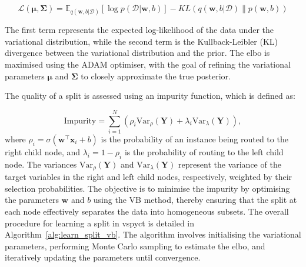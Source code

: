 \documentclass[3p,review,authoryear]{elsarticle}
\begin{document}
\begin{equation}
\mathcal{L}(\boldsymbol{\mu}, \boldsymbol{\Sigma}) = \mathbb{E}_{q(\mathbf{w}, b|\mathcal{D})}\left[\log p(\mathcal{D}|\mathbf{w}, b)\right] - KL\left(q(\mathbf{w}, b|\mathcal{D}) \parallel p(\mathbf{w}, b)\right)
\label{eq:elbo}
\end{equation}

The first term represents the expected log-likelihood of the data under the variational distribution, while the second term is the Kullback-Leibler (KL) divergence between the variational distribution and the prior. The \gls{elbo} is maximised using the ADAM optimiser, with the goal of refining the variational parameters \(\boldsymbol{\mu}\) and \(\boldsymbol{\Sigma}\) to closely approximate the true posterior.

The quality of a split is assessed using an impurity function, which is defined as:

\begin{equation}
\text{Impurity} = \sum_{i=1}^{N} \left(\rho_i \text{Var}_{\rho}(\mathbf{Y}) + \lambda_i  \text{Var}_{\lambda}(\mathbf{Y})\right),
\end{equation}
where \(\rho_i = \sigma(\mathbf{w}^\top \mathbf{x}_i + b)\) is the probability of an instance being routed to the right child node, and \(\lambda_i = 1 - \rho_i\) is the probability of routing to the left child node.
The variances \(\text{Var}_{\rho}(\mathbf{Y})\) and \(\text{Var}_{\lambda}(\mathbf{Y})\) represent the variance of the target variables in the right and left child nodes, respectively, weighted by their selection probabilities.
The objective is to minimise the impurity by optimising the parameters \(\mathbf{w}\) and \(b\) using the VB method, thereby ensuring that the split at each node effectively separates the data into homogeneous subsets.
The overall procedure for learning a split in \gls{vspyct} is detailed in Algorithm~\ref{alg:learn_split_vb}.
The algorithm involves initialising the variational parameters, performing Monte Carlo sampling to estimate the \gls{elbo}, and iteratively updating the parameters until convergence.

\end{document}
